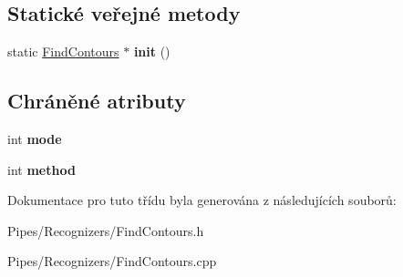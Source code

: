 \subsection*{Statické veřejné metody}
\begin{DoxyCompactItemize}
\item 
\hypertarget{class_ar_pipe_1_1_find_contours_a4b9c20aaf857866d9559d33edaf57a82}{static \hyperlink{class_ar_pipe_1_1_find_contours}{Find\-Contours} $\ast$ {\bfseries init} ()}\label{db/db3/class_ar_pipe_1_1_find_contours_a4b9c20aaf857866d9559d33edaf57a82}

\end{DoxyCompactItemize}
\subsection*{Chráněné atributy}
\begin{DoxyCompactItemize}
\item 
\hypertarget{class_ar_pipe_1_1_find_contours_a50a3f91071bc9b8650817b3b55bdc154}{int {\bfseries mode}}\label{db/db3/class_ar_pipe_1_1_find_contours_a50a3f91071bc9b8650817b3b55bdc154}

\item 
\hypertarget{class_ar_pipe_1_1_find_contours_a5c4eccb58ea37953f12850110228dc53}{int {\bfseries method}}\label{db/db3/class_ar_pipe_1_1_find_contours_a5c4eccb58ea37953f12850110228dc53}

\end{DoxyCompactItemize}


Dokumentace pro tuto třídu byla generována z následujících souborů\-:\begin{DoxyCompactItemize}
\item 
Pipes/\-Recognizers/Find\-Contours.\-h\item 
Pipes/\-Recognizers/Find\-Contours.\-cpp\end{DoxyCompactItemize}

